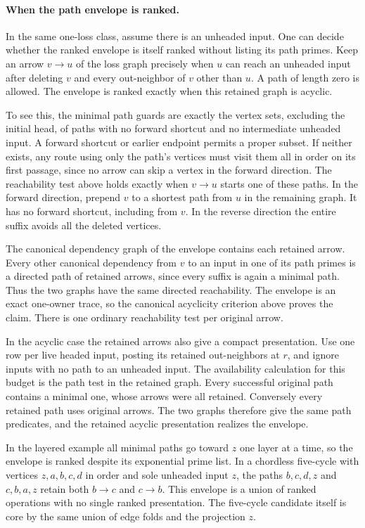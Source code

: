 \paragraph{When the path envelope is ranked.}
In the same one-loss class, assume there is an unheaded input.
One can decide whether the ranked envelope is itself ranked
without listing its path primes. Keep an arrow $v\to u$ of
the loss graph precisely when $u$ can reach an unheaded input
after deleting $v$ and every out-neighbor of $v$ other than
$u$. A path of length zero is allowed. The envelope is ranked
exactly when this retained graph is acyclic.

To see this, the minimal path guards are exactly the vertex
sets, excluding the initial head, of paths with no forward
shortcut and no intermediate unheaded input. A forward
shortcut or earlier endpoint permits a proper subset. If
neither exists, any route using only the path's vertices
must visit them all in order on its first passage, since
no arrow can skip a vertex in the forward direction.
The reachability test above holds exactly when $v\to u$
starts one of these paths. In the forward direction,
prepend $v$ to a shortest path from $u$ in the remaining
graph. It has no forward shortcut, including from $v$.
In the reverse direction the entire suffix avoids all
the deleted vertices.

The canonical dependency graph of the envelope contains
each retained arrow. Every other canonical dependency
from $v$ to an input in one of its path primes is a directed
path of retained arrows, since every suffix is again a
minimal path. Thus the two graphs have the same directed
reachability. The envelope is an exact one-owner trace,
so the canonical acyclicity criterion above proves the
claim. There is one ordinary reachability test per
original arrow.

In the acyclic case the retained arrows also give a compact
presentation. Use one row per live headed input, posting
its retained out-neighbors at $r$, and ignore inputs with
no path to an unheaded input. The availability calculation
for this budget is the path test in the retained graph.
Every successful original path contains a minimal one,
whose arrows were all retained. Conversely every retained
path uses original arrows. The two graphs therefore give
the same path predicates, and the retained acyclic
presentation realizes the envelope.

In the layered example all minimal paths go toward $z$ one
layer at a time, so the envelope is ranked despite its
exponential prime list. In a chordless five-cycle with
vertices $z,a,b,c,d$ in order and sole unheaded input $z$,
the paths $b,c,d,z$ and $c,b,a,z$ retain both $b\to c$
and $c\to b$. This envelope is a union of ranked operations
with no single ranked presentation. The five-cycle candidate
itself is core by the same union of edge folds and the
projection $z$.

